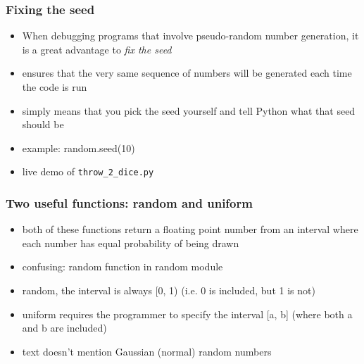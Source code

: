 \documentclass[14pt]{beamer}
\newcommand\red[1]{{\color{red} #1}}
\begin{document}

\begin{frame}[fragile]

\frametitle{Fixing the seed}

\begin{itemize}
	\item When debugging programs that involve pseudo-random number generation, it is a great advantage to \red{\emph{fix the seed}}
	\item ensures that the very same sequence of numbers will be generated each time the code is run
	\item simply means that you pick the seed yourself and tell Python what that seed should be
	\item example: random.seed(10)
	\item live demo of  \verb+throw_2_dice.py+
\end{itemize}

\end{frame}


\begin{frame}[fragile]

\frametitle{Two useful functions: random and uniform}

\begin{itemize}
	\item both of these functions return a floating point number from an interval where each number has equal probability of being drawn
	\item confusing: random function in random module
	\item random, the interval is always [0, 1) (i.e. 0 is included, but 1 is not)
	\item uniform requires the programmer to specify the interval [a, b] (where both a and b are included)
	\item text doesn't mention Gaussian (normal) random numbers
\end{itemize}

\end{frame}

\end{document}

